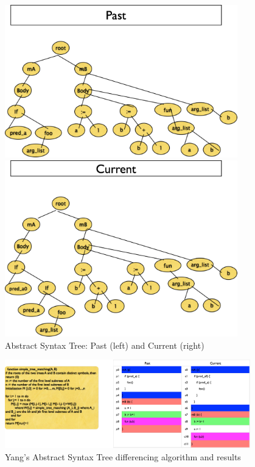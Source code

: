 \begin{figure}
\centering
\begin{minipage}{.45\textwidth}
  \centering
\includegraphics[width=0.9\textwidth]{images/PastAST.pdf}
\end{minipage}
\begin{minipage}{.45\textwidth}
  \centering
\includegraphics[width=0.9\textwidth]{images/CurrentAST.pdf}
\end{minipage}
\caption{Abstract Syntax Tree: Past (left) and Current (right)} 
\label{fig:AST} 
\end{figure}

\begin{figure}
\centering
\includegraphics[width=0.95\textwidth]{images/Yang.pdf}
\caption{Yang's Abstract Syntax Tree differencing algorithm and results} 
\label{fig:YangDiff} 
\end{figure}


